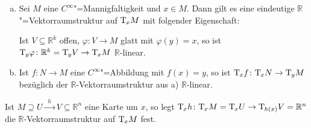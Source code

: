 \begin{proposition}[{name=[Vektorraumstruktur und Linearität der Tangentialabbildungen]}]
	\begin{enumerate}[a)]
		\item Sei $M$ eine $C^\infty$"=Mannigfaltigkeit und $x \in M$. 
		Dann gilt es eine eindeutige $\mathbb{R}$"=Vektorraumstruktur auf $\mathrm{T}\mkern-0.85mu_x M$ mit folgender Eigenschaft:
	
		Ist $V \subseteq \mathbb{R}^k$ offen, $\varphi \colon V \to M$ glatt mit $\varphi(y)=x$, so ist 
		\(
			\mathrm{T}\mkern-0.85mu_y \varphi \colon \mathbb{R}^k = \mathrm{T}\mkern-0.85mu_y V \to \mathrm{T}\mkern-0.85mu_x M
		\)
		$\mathbb{R}$-linear.
		\item Ist $f \colon N \to M$ eine $C^\infty$"=Abbildung mit $f(x)=y$, so ist $\mathrm{T}\mkern-0.85mu_x f \colon \mathrm{T}\mkern-0.85mu_x N \to \mathrm{T}\mkern-0.85mu_{y} M$ bezüglich der $\mathbb{R}$-Vektorraumstruktur aus a) $\mathbb{R}$-linear.
	\end{enumerate}
	\noindent Ist $M \supseteq U \xrightarrow{\enspace h \enspace} V \subseteq \mathbb{R}^n$ eine Karte um $x$, so legt $\mathrm{T}\mkern-0.85mu_x h \colon \mathrm{T}\mkern-0.85mu_x M = \mathrm{T}\mkern-0.85mu_x U \to \mathrm{T}\mkern-0.85mu_{h(x)}V = \mathbb{R}^n$ die $\mathbb{R}$-Vektorraumstruktur auf $\mathrm{T}\mkern-0.85mu_x M$ fest.
\end{proposition}
